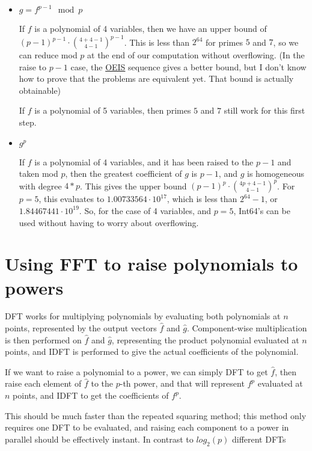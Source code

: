 \documentclass{article}
\begin{document}
\begin{itemize}
    \item $g = f^{p - 1}\mod p$
    
    If $f$ is a polynomial of 4 variables, then we have an upper bound of $(p - 1)^{p-1} \cdot \binom{4 + 4 - 1}{4 - 1}^{p - 1}$. This is less than $2^{64}$ for primes $5$ and $7$, so we can reduce mod $p$ at the end of our computation without overflowing. (In the raise to $p-1$ case, the \href{https://oeis.org/A333901/internal}{OEIS} sequence gives a better bound, but I don't know how to prove that the problems are equivalent yet. That bound is actually obtainable)

    If $f$ is a polynomial of 5 variables, then primes $5$ and $7$ still work for this first step.

    \item $g ^ p$
    
    If $f$ is a polynomial of 4 variables, and it has been raised to the $p-1$ and taken mod $p$, then the greatest coefficient of $g$ is $p-1$, and $g$ is homogeneous with degree $4 * p$. This gives the upper bound $(p - 1)^{p} \cdot \binom{4p + 4 - 1}{4 - 1}^{p}$. For $p=5$, this evaluates to $1.00733564 \cdot 10^{17}$, which is less than $2^{64} - 1$, or $1.84467441 \cdot 10^{19}$. So, for the case of 4 variables, and $p = 5$, Int64's can be used without having to worry about overflowing.
\end{itemize}

\section*{Using FFT to raise polynomials to powers}
DFT works for multiplying polynomials by evaluating both polynomials at $n$ points, represented by the output vectors $\hat{f}$ and $\hat{g}$. Component-wise multiplication is then performed on $\hat{f}$ and $\hat{g}$, representing the product polynomial evaluated at $n$ points, and IDFT is performed to give the actual coefficients of the polynomial.

If we want to raise a polynomial to a power, we can simply DFT to get $\hat{f}$, then raise each element of $\hat{f}$ to the $p$-th power, and that will represent $f^p$ evaluated at $n$ points, and IDFT to get the coefficients of $f^p$.

This should be much faster than the repeated squaring method; this method only requires one DFT to be evaluated, and raising each component to a power in parallel should be effectively instant. In contrast to $log_2(p)$ different DFTs
\end{document}
